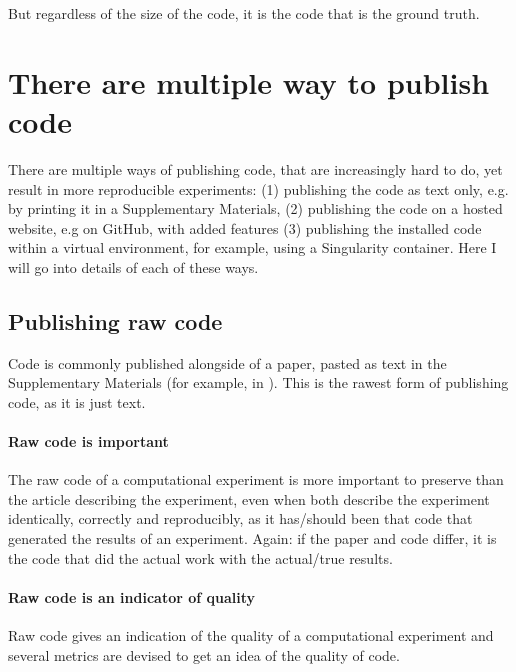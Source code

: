 But regardless of the size of the code, 
it is the code that is the ground truth.

\section{There are multiple way to publish code}

There are multiple ways of publishing code,
that are increasingly hard to do, yet result
in more reproducible experiments:
(1) publishing the code as text only, e.g. by printing
it in a Supplementary Materials, (2) publishing
the code on a hosted website, e.g on GitHub, with
added features (3) publishing 
the installed code within a virtual environment,
for example, using a Singularity container.
Here I will go into details of each of these ways.

\subsection{Publishing raw code}

Code is commonly published alongside of a 
paper, pasted as text in the Supplementary Materials 
(for example, in \cite{labrecque2019interpretation}).
This is the rawest form of publishing code,
as it is just text.

\paragraph{Raw code is important}

The raw code of a computational experiment is
more important to preserve than the article describing
the experiment, even when both describe the experiment identically,
correctly and reproducibly, 
as it has/should been that code that generated the results of an experiment.
Again: if the paper and code differ, it is the code that did
the actual work with the actual/true results.

\paragraph{Raw code is an indicator of quality}

Raw code gives an indication of the quality 
of a computational experiment and several metrics are
devised to get an idea of the quality of code.

